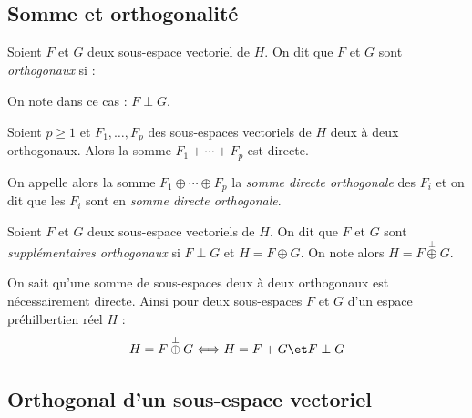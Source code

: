 \documentclass[french,11pt,twoside]{VcCours}
\begin{document}
\begin{Demonstration}{}
\vspace{5cm}
\end{Demonstration}


\subsection{Somme et orthogonalité}

\begin{Definition}{} Soient $F$ et $G$ deux sous-espace vectoriel de $H$. On dit que $F$ et $G$ sont \emph{orthogonaux} si :
$$ \phantom{\forall (f,g) \in F \times G, \; <f,g>=0}$$
On note dans ce cas : $F \perp G$.
\end{Definition}

\begin{TheoremeDefinition}{} Soient $p \geq 1$ et $F_1, \ldots, F_p$ des sous-espaces vectoriels de $H$ deux à deux orthogonaux. Alors la somme $F_1 + \cdots + F_p$ est directe.

On appelle alors la somme $F_1 \oplus \cdots \oplus F_p$ la \emph{somme directe orthogonale} des $F_i$ et on dit que les $F_i$ sont en \emph{somme directe orthogonale}.
\end{TheoremeDefinition}

\begin{Demonstration}{}

\vspace{5cm}
\end{Demonstration}

\begin{Definition}{} Soient $F$ et $G$ deux sous-espace vectoriels de $H$. On dit que $F$ et $G$ sont \emph{supplémentaires orthogonaux} si $F \perp G$ et $H=F \oplus G $. On note alors $H= F \overset{\perp}{\oplus} G$.
\end{Definition}

\begin{Remarque}{} On sait qu'une somme de sous-espaces deux à deux orthogonaux est nécessairement directe. Ainsi pour deux sous-espaces $F$ et $G$ d'un espace préhilbertien réel $H$ : 
$$H= F \overset{\perp}{\oplus} G  \Longleftrightarrow  H = F+G \et F \perp G$$
\end{Remarque}

\subsection{Orthogonal d'un sous-espace vectoriel}
\end{document}
